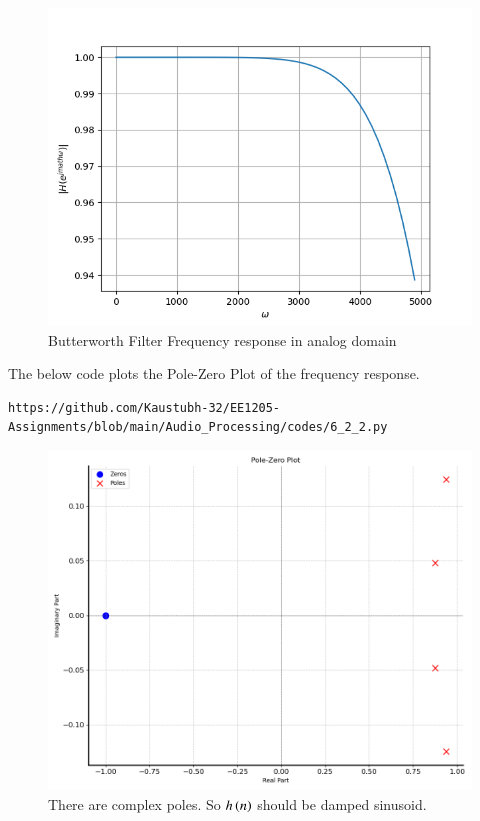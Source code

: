\documentclass[journal,12pt,twocolumn]{IEEEtran}
\theoremstyle{remark}
\begin{document}
\begin{enumerate}[label=\thesection.\arabic*]
\begin{figure}[H]
\includegraphics[width=1\columnwidth]{6_2_4.png}
\caption{Butterworth Filter Frequency response in analog domain}
\label{fig:H(w)_6}
\end{figure}



The below code plots the Pole-Zero Plot of the frequency response.
\begin{lstlisting}
https://github.com/Kaustubh-32/EE1205-Assignments/blob/main/Audio_Processing/codes/6_2_2.py
\end{lstlisting}
\begin{figure}[H]
\centering
\includegraphics[width=1\columnwidth]{6_2_2_pole.png}
\caption{There are complex poles. So $h\left(n\right)$ should be damped sinusoid.}
\label{fig:pole_zero_6.2}
\end{figure}


\end{enumerate}
\end{document}
